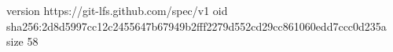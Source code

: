 version https://git-lfs.github.com/spec/v1
oid sha256:2d8d5997cc12c2455647b67949b2fff2279d552cd29cc861060edd7ccc0d235a
size 58
